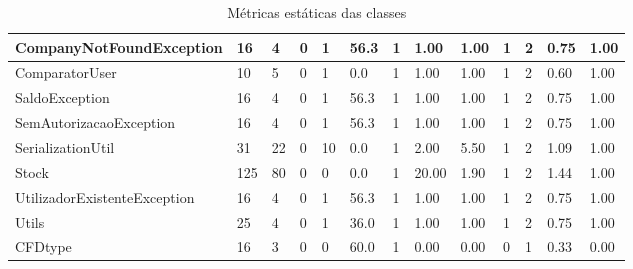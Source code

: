 \begin{table}[ht]
\begin{adjustbox}{width=1\textwidth}
\begin{tabular}{|l|l|l|l|l|l|l|l|l|l|l|l|l|}
CompanyNotFoundException     & 16           & 4          & 0               & 1        & 56.3           & 1       & 1.00            & 1.00                       & 1                   & 2                   & 0.75               & 1.00               \\ \hline
ComparatorUser               & 10           & 5          & 0               & 1        & 0.0            & 1       & 1.00            & 1.00                       & 1                   & 2                   & 0.60               & 1.00               \\ \hline
SaldoException               & 16           & 4          & 0               & 1        & 56.3           & 1       & 1.00            & 1.00                       & 1                   & 2                   & 0.75               & 1.00               \\ \hline
SemAutorizacaoException      & 16           & 4          & 0               & 1        & 56.3           & 1       & 1.00            & 1.00                       & 1                   & 2                   & 0.75               & 1.00               \\ \hline
SerializationUtil            & 31           & 22         & 0               & 10       & 0.0            & 1       & 2.00            & 5.50                       & 1                   & 2                   & 1.09               & 1.00               \\ \hline
Stock                        & 125          & 80         & 0               & 0        & 0.0            & 1       & 20.00           & 1.90                       & 1                   & 2                   & 1.44               & 1.00               \\ \hline
UtilizadorExistenteException & 16           & 4          & 0               & 1        & 56.3           & 1       & 1.00            & 1.00                       & 1                   & 2                   & 0.75               & 1.00               \\ \hline
Utils                        & 25           & 4          & 0               & 1        & 36.0           & 1       & 1.00            & 1.00                       & 1                   & 2                   & 0.75               & 1.00               \\ \hline
CFDtype                      & 16           & 3          & 0               & 0        & 60.0           & 1       & 0.00            & 0.00                       & 0                   & 1                   & 0.33               & 0.00               \\ \hline
\end{tabular}
\end{adjustbox}
\caption{Métricas estáticas das classes}
\end{table}


